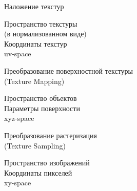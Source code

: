 \documentclass{beamer}
\begin{document}
	\begin{frame}{Наложение текстур}

		\hfill Пространство текстуры \\
		\hfill (в нормализованном виде) \\
		\hfill Координаты текстур \\
		\hfill uv-space

		Преобразование поверхностной текстуры\\ (Texture Mapping)

		\hfill Пространство объектов \\
		\hfill Параметры поверхности \\
		\hfill xyz-space
		
		Преобразование растеризация \\ (Texture Sampling)
		
		\hfill Пространство изображений \\
		\hfill Координаты пикселей \\
		\hfill xy-space
		

	\end{frame}
\end{document}
